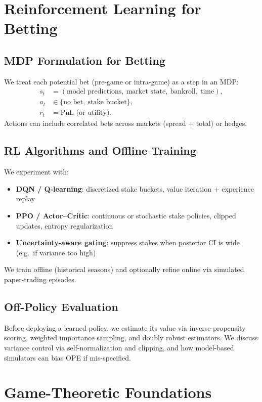 \section{Reinforcement Learning for Betting}
\label{sec:rl}

\subsection{MDP Formulation for Betting}
We treat each potential bet (pre-game or intra-game) as a step in an MDP:
\[
\begin{aligned}
s_t &= (\text{model predictions},\ \text{market state},\ \text{bankroll},\ \text{time}),\\
a_t &\in \{\text{no bet},\ \text{stake bucket}\},\\
r_t &= \text{PnL (or utility)}.
\end{aligned}
\]
Actions can include correlated bets across markets (spread + total) or hedges.

\subsection{RL Algorithms and Offline Training}
We experiment with:
\begin{itemize}
  \item \textbf{DQN / Q-learning}: discretized stake buckets, value iteration + experience replay
  \item \textbf{PPO / Actor–Critic}: continuous or stochastic stake policies, clipped updates, entropy regularization
  \item \textbf{Uncertainty-aware gating}: suppress stakes when posterior CI is wide (e.g.\ if variance too high)
\end{itemize}
We train offline (historical seasons) and optionally refine online via simulated paper-trading episodes.

\subsection{Off-Policy Evaluation}
Before deploying a learned policy, we estimate its value via inverse-propensity scoring, weighted importance sampling, and doubly robust estimators. We discuss variance control via self-normalization and clipping, and how model-based simulators can bias OPE if mis-specified.

\section{Game-Theoretic Foundations}
\label{sec:game-theory}
